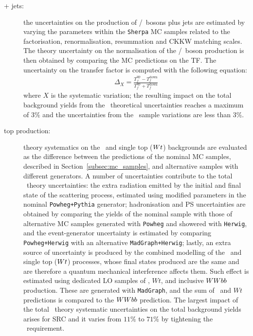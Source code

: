 			\begin{description}
				\item [ + jets:] the uncertainties on the production of \Wboson/\Zboson\ bosons plus jets are estimated by varying the parameters within the \texttt{Sherpa} \ac{MC} samples related to the factorisation, renormalisation, resummation and \ac{CKKW} matching scales. The theory uncertainty on the normalisation of the \Wboson/\Zboson\ boson production is then obtained by comparing the \ac{MC} predictions on the \ac{TF}. The uncertainty on the transfer factor is computed with the following equation: 
				\begin{eqnarray}
    				\Delta_{X} = \frac{T_f^{\mathrm{up}} - T_f^{\mathrm{down}}}{T_f^{\mathrm{up}} + T_f^{\mathrm{down}}}
    			\label{eq:theory_uncertainty}
				\end{eqnarray}
				\noindent where $X$ is the systematic variation; the resulting impact on the total background yields from the \Zjets\ theoretical uncertainties reaches a maximum of $3\%$ and the uncertainties from the \Wjets\ sample variations are less than $3\%$.

				\item [top production:] theory systematics on the \ttbar\ and single top ($W t$) backgrounds are evaluated as the difference between the predictions of the nominal \ac{MC} samples, described in Section~\ref{subsec:mc_samples}, and alternative samples with different generators. A number of uncertainties contribute to the total \ttbar\ theory uncertainties: the extra radiation emitted by the initial and final state of the scattering process, estimated using modified parameters in the nominal \texttt{Powheg+Pythia} generator; hadronisation and \ac{PS} uncertainties are obtained by comparing the yields of the nominal sample with those of alternative \ac{MC} samples generated with \texttt{Powheg} and showered with \texttt{Herwig}, and the event-generator uncertainty is estimated by comparing \texttt{Powheg+Herwig} with an alternative \texttt{MadGraph+Herwig}; lastly, an extra source of uncertainty is produced by the combined modelling of the \ttbar\ and single top ($W t$) processes, whose final states produced are the same and are therefore a quantum mechanical interference affects them. Such effect is estimated using dedicated \ac{LO} samples of \ttbar, $Wt$, and inclusive $WW bb$ production. These are generated with \texttt{MadGraph}, and the sum of \ttbar\ and $Wt$ predictions is compared to the $WW bb$ prediction. The largest impact of the total \ttbar\ theory systematic uncertainties on the total background yields arises for SRC and it varies from $11\%$ to $71\%$ by tightening the \rISR\ requirement.


\end{description}
